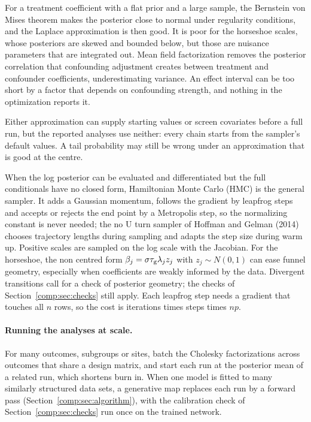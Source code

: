 For a treatment coefficient with a flat prior and a large sample, the Bernstein von Mises theorem makes the posterior close to normal under regularity conditions, and the Laplace approximation is then good. It is poor for the horseshoe scales, whose posteriors are skewed and bounded below, but those are nuisance parameters that are integrated out. Mean field factorization removes the posterior correlation that confounding adjustment creates between treatment and confounder coefficients, underestimating variance. An effect interval can be too short by a factor that depends on confounding strength, and nothing in the optimization reports it.

Either approximation can supply starting values or screen covariates before a full run, but the reported analyses use neither: every chain starts from the sampler's default values. A tail probability may still be wrong under an approximation that is good at the centre.

When the log posterior can be evaluated and differentiated but the full conditionals have no closed form, Hamiltonian Monte Carlo (HMC) is the general sampler. It adds a Gaussian momentum, follows the gradient by leapfrog steps and accepts or rejects the end point by a Metropolis step, so the normalizing constant is never needed; the no U turn sampler of Hoffman and Gelman (2014) chooses trajectory lengths during sampling and adapts the step size during warm up. Positive scales are sampled on the log scale with the Jacobian. For the horseshoe, the non centred form $\beta_j=\sigma\tau_{\mathrm{g}}\lambda_jz_j$ with $z_j\sim N(0,1)$ can ease funnel geometry, especially when coefficients are weakly informed by the data. Divergent transitions call for a check of posterior geometry; the checks of Section~\ref{comp:sec:checks} still apply. Each leapfrog step needs a gradient that touches all $n$ rows, so the cost is iterations times steps times $np$. 

\paragraph{Running the analyses at scale.} For many outcomes, subgroups or sites, batch the Cholesky factorizations across outcomes that share a design matrix, and start each run at the posterior mean of a related run, which shortens burn in. When one model is fitted to many similarly structured data sets, a generative map replaces each run by a forward pass (Section~\ref{comp:sec:algorithm}), with the calibration check of Section~\ref{comp:sec:checks} run once on the trained network.
